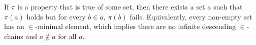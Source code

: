 If $\pi$ is a property that is true of some set, then there exists a set $a$ such that $\pi(a)$ holds but for every $b \in a$, $\pi(b)$ fails. Equivalently, every non-empty set has an $\in$-minimal element, which implies there are no infinite descending $\in$-chains and $a \notin a$ for all $a$.
